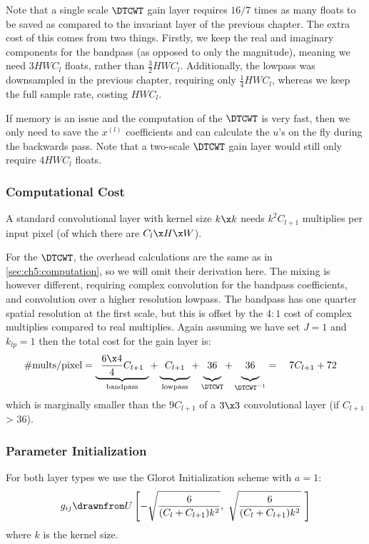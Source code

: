Note that a single scale $\DTCWT$ gain layer requires $16/7$ times as many
floats to be saved as compared to the invariant layer of the previous chapter.
The extra cost of this comes from two things. Firstly, we keep the real and
imaginary components for the bandpass (as opposed to only the magnitude),
meaning we need $3HWC_l$ floats, rather than $\frac{3}{2}HWC_l$. Additionally,
the lowpass was downsampled in the previous chapter, requiring only
$\frac{1}{4}HWC_l$, whereas we keep the full sample rate, costing $HWC_l$.

If memory is an issue and the computation of the $\DTCWT$ is very fast, then we
only need to save the $x^{(l)}$ coefficients and can calculate the $u$'s on the
fly during the backwards pass. Note that a two-scale $\DTCWT$ gain layer would
still only require $4HWC_l$ floats.

\subsubsection{Computational Cost}\label{sec:ch6:computation}
A standard convolutional layer with kernel size $k\x k$ needs $k^2C_{l+1}$
multiplies per input pixel (of which there are $C_{l}\x H\x W$).

For the $\DTCWT$, the overhead calculations are the same as in
\autoref{sec:ch5:computation}, so we will omit their derivation here. The mixing
is however different, requiring complex convolution for the bandpass
coefficients, and convolution over a higher resolution lowpass. The bandpass has
one quarter spatial resolution at the first scale, but this is offset by the
$4:1$ cost of complex multiplies compared to real multiplies. Again assuming we
have set $J=1$ and $k_{lp} = 1$ then the total cost for the gain layer is:
%
\begin{equation}
  \text{\#mults/pixel} = \underbrace{\hphantom{1} \frac{6\x 4}{4}C_{l+1} \hphantom{1}}_{\textrm{bandpass}} +
  \underbrace{\hphantom{1}\vphantom{\frac{6}{4}} C_{l+1} \hphantom{1}}_{\textrm{lowpass}} + 
  \underbrace{\vphantom{\frac{6}{4}} 36}_{\DTCWT} + 
  \underbrace{\vphantom{\frac{6}{4}} 36}_{\DTCWT^{-1}} = \quad 7C_{l+1} + 72 \quad
  \label{eq:ch6:comp_dtcwt}
\end{equation}
which is marginally smaller than the $9C_{l+1}$ of a $3\x 3$ convolutional layer (if $C_{l+1}$ > 36).

\subsubsection{Parameter Initialization}
For both layer types we use the Glorot Initialization scheme \cite{glorot_understanding_2010}
with $a=1$: 
%
\begin{equation}
  g_{ij} \drawnfrom U\left[ -\sqrt{\frac{6}{(C_l + C_{l+1})k^2}},\ \sqrt{\frac{6}{(C_l + C_{l+1})k^2}}\
  \right] \label{eq:ch6:glorot}
\end{equation}
where $k$ is the kernel size.
